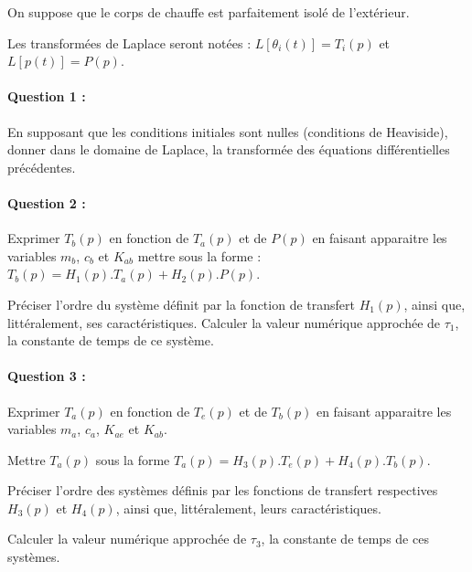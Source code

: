 On suppose que le corps de chauffe est parfaitement isolé de l'extérieur.

Les transformées de Laplace seront notées : $L[\theta_i(t)]=T_i(p)$ et $L[p(t)]=P(p)$.

\paragraph{Question 1 :} En supposant que les conditions initiales sont nulles (conditions de Heaviside), donner dans le domaine de Laplace, la transformée des équations différentielles précédentes.

\paragraph{Question 2 :} Exprimer $T_b(p)$ en fonction de $T_a(p)$ et de $P(p)$ en faisant apparaitre les variables $m_b$, $c_b$ et $K_{ab}$ mettre sous la forme : $T_b(p)=H_1(p).T_a(p)+H_2(p).P(p)$.

Préciser l'ordre du système définit par la fonction de transfert $H_1(p)$, ainsi que, littéralement, ses caractéristiques.
Calculer la valeur numérique approchée de $\tau_1$, la constante de temps de ce système.

\paragraph{Question 3 :} Exprimer $T_a(p)$ en fonction de $T_e(p)$ et de $T_b(p)$ en faisant apparaitre les variables $m_a$, $c_a$, $K_{ae}$ et $K_{ab}$.

Mettre $T_a(p)$ sous la forme $T_a(p)=H_3(p).T_e(p)+H_4(p).T_b(p)$.

Préciser l'ordre des systèmes définis par les fonctions de transfert respectives $H_3(p)$ et $H_4(p)$, ainsi que, littéralement, leurs caractéristiques.

Calculer la valeur numérique approchée de $\tau_3$, la constante de temps de ces systèmes.

